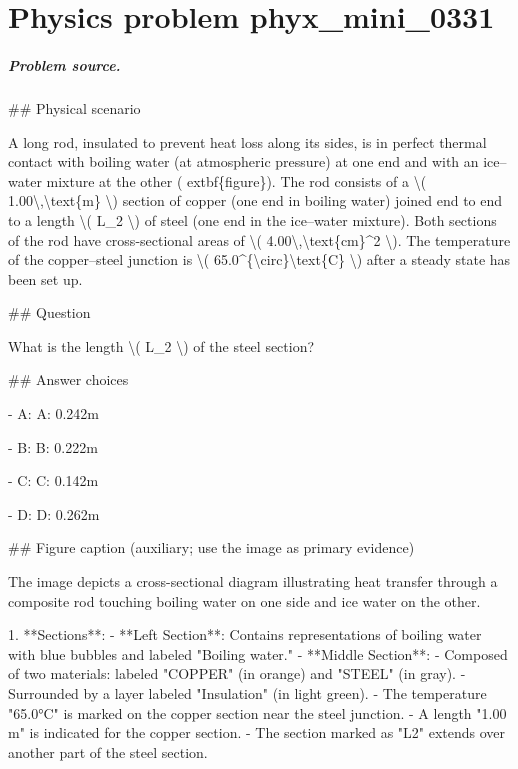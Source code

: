 
\chapter{Physics problem phyx\_mini\_0331}
\label{ch:PhyXMiniProblems_problem_phyx_mini_0331}

\paragraph{Problem source.}
\#\# Physical scenario

A long rod, insulated to prevent heat loss along its sides, is in perfect thermal contact with boiling water (at atmospheric pressure) at one end and with an ice–water mixture at the other (	extbf\{figure\}). The rod consists of a \textbackslash{}( 1.00\textbackslash{},\textbackslash{}text\{m\} \textbackslash{}) section of copper (one end in boiling water) joined end to end to a length \textbackslash{}( L\_2 \textbackslash{}) of steel (one end in the ice–water mixture). Both sections of the rod have cross-sectional areas of \textbackslash{}( 4.00\textbackslash{},\textbackslash{}text\{cm\}\textasciicircum{}2 \textbackslash{}). The temperature of the copper–steel junction is \textbackslash{}( 65.0\textasciicircum{}\{\textbackslash{}circ\}\textbackslash{}text\{C\} \textbackslash{}) after a steady state has been set up.

\#\# Question

What is the length \textbackslash{}( L\_2 \textbackslash{}) of the steel section?

\#\# Answer choices

- A: A: 0.242m

- B: B: 0.222m

- C: C: 0.142m

- D: D: 0.262m

\#\# Figure caption (auxiliary; use the image as primary evidence)

The image depicts a cross-sectional diagram illustrating heat transfer through a composite rod touching boiling water on one side and ice water on the other. 

1. **Sections**:
   - **Left Section**: Contains representations of boiling water with blue bubbles and labeled "Boiling water."
   - **Middle Section**:
     - Composed of two materials: labeled "COPPER" (in orange) and "STEEL" (in gray).
     - Surrounded by a layer labeled "Insulation" (in light green).
     - The temperature "65.0°C" is marked on the copper section near the steel junction.
     - A length "1.00 m" is indicated for the copper section.
     - The section marked as "L2" extends over another part of the steel section.
   
